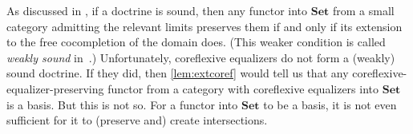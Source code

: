 \documentclass[11pt, oneside, article]{memoir}
\theoremstyle{plain}
\theoremstyle{definition}
\theoremstyle{remark}
\newenvironment{counterexample}
{\renewcommand\qedsymbol{$\lrcorner$}%
  \pushQED{\qed}\mycounterexample}
{\popQED\endmycounterexample}
\DeclareMathOperator{\Psh}{Psh}
\newcommand{\namedcat}[1]{\mathbf{#1}}
\newcommand{\Set}{\namedcat{Set}}
\newcommand{\extend}[1]{\widehat{#1}}
\newcommand{\arro}{\mathbf{2}}
\newcommand{\ph}[1]{#1}
\newcommand{\Ps}[1]{\Psh(#1)}
\newcommand{\pP}{\ph{P}}
\begin{document}
As discussed in \cite[Remark 2.6]{adamek-borceux-lack-rosicky}, if a
doctrine is sound, then any functor into $\Set$ from a small category
admitting the relevant limits preserves them if and only if its
extension to the free cocompletion of the domain does. (This weaker
condition is called \emph{weakly sound} in~\cite{tendas}.)
Unfortunately, coreflexive equalizers do not form a (weakly) sound
doctrine. If they did, then \cref{lem:extcoref} would tell us that any
coreflexive-equalizer-preserving functor from a category with
coreflexive equalizers into $\Set$ is a basis.
But this is not so. For a functor into $\Set$ to be a basis, it is not
even sufficient for it to (preserve and) create intersections.
\end{document}
